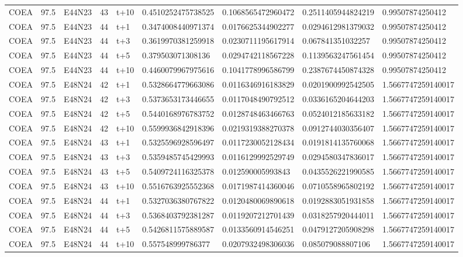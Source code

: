 \begin{landscape}
\begin{longtable}{lllllllll}
COEA & 97.5 & E44N23 & 43 & t+10 & 0.4510252475738525 & 0.1068565472960472 & 0.2511405944824219 & 0.99507874250412 \\
COEA & 97.5 & E44N23 & 44 & t+1 & 0.3474008440971374 & 0.0176625344902277 & 0.0294612981379032 & 0.99507874250412 \\
COEA & 97.5 & E44N23 & 44 & t+3 & 0.3619970381259918 & 0.0230711195617914 & 0.067841351032257 & 0.99507874250412 \\
COEA & 97.5 & E44N23 & 44 & t+5 & 0.379503071308136 & 0.0294742118567228 & 0.1139563247561454 & 0.99507874250412 \\
COEA & 97.5 & E44N23 & 44 & t+10 & 0.4460079967975616 & 0.1041778996586799 & 0.2387674450874328 & 0.99507874250412 \\
COEA & 97.5 & E48N24 & 42 & t+1 & 0.5328664779663086 & 0.0116346916183829 & 0.0201900992542505 & 1.5667747259140017 \\
COEA & 97.5 & E48N24 & 42 & t+3 & 0.5373653173446655 & 0.0117048490792512 & 0.0336165204644203 & 1.5667747259140017 \\
COEA & 97.5 & E48N24 & 42 & t+5 & 0.5440168976783752 & 0.0128748463466763 & 0.0524012185633182 & 1.5667747259140017 \\
COEA & 97.5 & E48N24 & 42 & t+10 & 0.5599936842918396 & 0.0219319388270378 & 0.0912744030356407 & 1.5667747259140017 \\
COEA & 97.5 & E48N24 & 43 & t+1 & 0.5325596928596497 & 0.0117230052128434 & 0.0191814135760068 & 1.5667747259140017 \\
COEA & 97.5 & E48N24 & 43 & t+3 & 0.5359485745429993 & 0.0116129992529749 & 0.0294580347836017 & 1.5667747259140017 \\
COEA & 97.5 & E48N24 & 43 & t+5 & 0.5409724116325378 & 0.012590005993843 & 0.0435526221990585 & 1.5667747259140017 \\
COEA & 97.5 & E48N24 & 43 & t+10 & 0.5516763925552368 & 0.0171987414360046 & 0.0710558965802192 & 1.5667747259140017 \\
COEA & 97.5 & E48N24 & 44 & t+1 & 0.5327036380767822 & 0.0120480069890618 & 0.0192883051931858 & 1.5667747259140017 \\
COEA & 97.5 & E48N24 & 44 & t+3 & 0.5368403792381287 & 0.0119207212701439 & 0.0318257920444011 & 1.5667747259140017 \\
COEA & 97.5 & E48N24 & 44 & t+5 & 0.5426811575889587 & 0.0133560914546251 & 0.0479127205908298 & 1.5667747259140017 \\
COEA & 97.5 & E48N24 & 44 & t+10 & 0.557548999786377 & 0.0207932498306036 & 0.085079088807106 & 1.5667747259140017 \\

\end{longtable}
\end{landscape}
